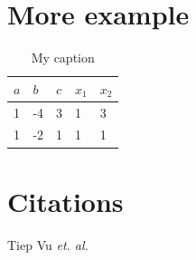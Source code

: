 \documentclass[10pt]{article}
\begin{document}
\section{More example} %
\label{sec:more_example}
\begin{table}[]
\centering
\caption{My caption}
\label{my-label}
\begin{tabular}{|l|l|l|l|l|}
\hline
$a$ & $b$  & $c$ & $x_1$ & $x_2$ \\ \hline
1 & -4 & 3 & 1    & 3    \\ \hline
1 & -2 & 1 & 1    & 1    \\ \hline
\end{tabular}
\end{table}

\section{Citations} %
\label{sec:citations}
Tiep Vu \textit{et. al.} \cite{vu2015dfdl}



\end{document}
